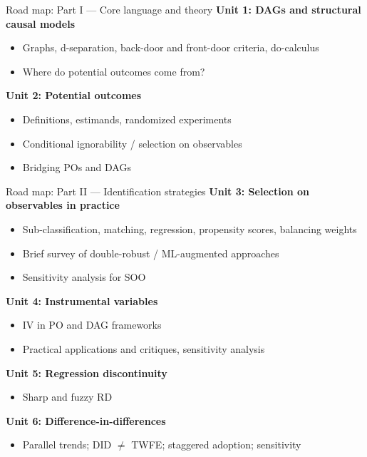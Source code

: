 \documentclass[xcolor=dvipsnames]{beamer}
\begin{document}

\begin{frame}{Road map: Part I --- Core language and theory}
\textbf{Unit 1: DAGs and structural causal models}\\
\small
\begin{itemize}
	\item Graphs, d-separation, back-door and front-door criteria, do-calculus
	\item Where do potential outcomes come from?
\end{itemize}
\medskip

\normalsize
\textbf{Unit 2: Potential outcomes}\\
\small
\begin{itemize}
\item Definitions, estimands, randomized experiments
\item Conditional ignorability / selection on observables
\item Bridging POs and DAGs
\end{itemize}
\end{frame}

\begin{frame}{Road map: Part II --- Identification strategies}
\small
\textbf{Unit 3: Selection on observables in practice}\\
\footnotesize
\begin{itemize}
\item Sub-classification, matching, regression, propensity scores, balancing weights
\item Brief survey of double-robust / ML-augmented approaches
\item Sensitivity analysis for SOO
\end{itemize}
\medskip
\small
\textbf{Unit 4: Instrumental variables}\\
\footnotesize
\begin{itemize}
\item IV in PO and DAG frameworks
\item Practical applications and critiques, sensitivity analysis
\end{itemize}
\medskip
\small
\textbf{Unit 5: Regression discontinuity}\\
\footnotesize
\begin{itemize}
\item Sharp and fuzzy RD
\end{itemize}
\medskip
\small
\textbf{Unit 6: Difference-in-differences}\\
\footnotesize
\begin{itemize}
\item Parallel trends; DID $\neq$ TWFE; staggered adoption; sensitivity
\end{itemize}
\end{frame}
\end{document}
